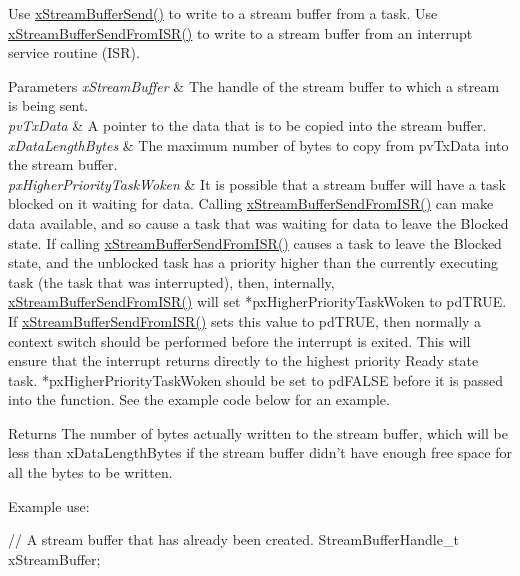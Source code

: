 \begin{DoxyPre}
\begin{DoxyPre}   Use \hyperlink{stream__buffer_8h_a35cdf3b6bf677086b9128782f762499d}{xStreamBufferSend()} to write to a stream buffer from a task.  Use
   \hyperlink{stream__buffer_8h_a1dab226e99230e01e79bc2b5c0605e44}{xStreamBufferSendFromISR()} to write to a stream buffer from an interrupt
   service routine (ISR).\end{DoxyPre}
\end{DoxyPre}



\begin{DoxyPre}
\begin{DoxyPre}   
\begin{DoxyParams}{Parameters}
{\em xStreamBuffer} & The handle of the stream buffer to which a stream is
   being sent.\\
\hline
{\em pvTxData} & A pointer to the data that is to be copied into the stream
   buffer.\\
\hline
{\em xDataLengthBytes} & The maximum number of bytes to copy from pvTxData
   into the stream buffer.\\
\hline
{\em pxHigherPriorityTaskWoken} & It is possible that a stream buffer will
   have a task blocked on it waiting for data.  Calling
   \hyperlink{stream__buffer_8h_a1dab226e99230e01e79bc2b5c0605e44}{xStreamBufferSendFromISR()} can make data available, and so cause a task that
   was waiting for data to leave the Blocked state.  If calling
   \hyperlink{stream__buffer_8h_a1dab226e99230e01e79bc2b5c0605e44}{xStreamBufferSendFromISR()} causes a task to leave the Blocked state, and the
   unblocked task has a priority higher than the currently executing task (the
   task that was interrupted), then, internally, \hyperlink{stream__buffer_8h_a1dab226e99230e01e79bc2b5c0605e44}{xStreamBufferSendFromISR()}
   will set *pxHigherPriorityTaskWoken to pdTRUE.  If
   \hyperlink{stream__buffer_8h_a1dab226e99230e01e79bc2b5c0605e44}{xStreamBufferSendFromISR()} sets this value to pdTRUE, then normally a
   context switch should be performed before the interrupt is exited.  This will
   ensure that the interrupt returns directly to the highest priority Ready
   state task.  *pxHigherPriorityTaskWoken should be set to pdFALSE before it
   is passed into the function.  See the example code below for an example.\\
\hline
\end{DoxyParams}
\begin{DoxyReturn}{Returns}
The number of bytes actually written to the stream buffer, which will
   be less than xDataLengthBytes if the stream buffer didn't have enough free
   space for all the bytes to be written.
\end{DoxyReturn}
Example use:

\begin{DoxyPre}
// A stream buffer that has already been created.
StreamBufferHandle\_t xStreamBuffer;\end{DoxyPre}
\end{DoxyPre}
\end{DoxyPre}



